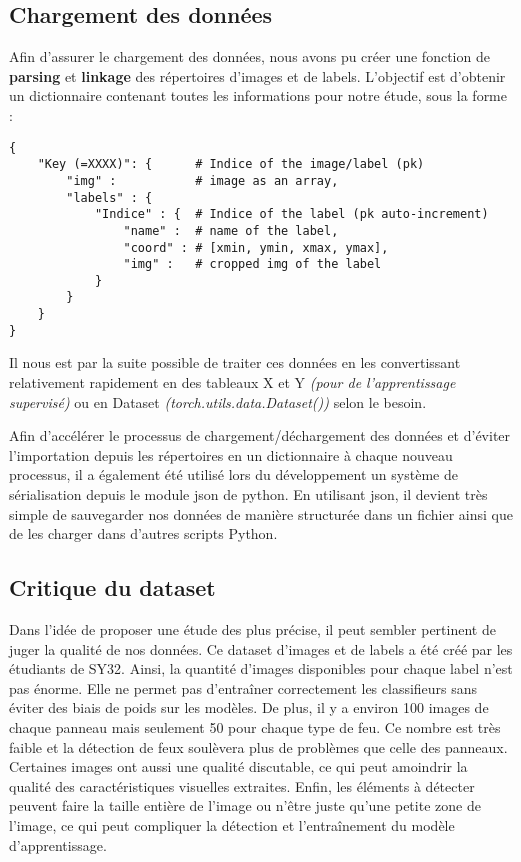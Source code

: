 \documentclass[a4paper,11pt]{article}
\begin{document}
\subsection{Chargement des données}

Afin d'assurer le chargement des données, nous avons pu créer une fonction de \textbf{parsing} et \textbf{linkage} des répertoires d'images et de labels. L'objectif est d'obtenir un dictionnaire contenant toutes les informations pour notre étude, sous la forme : 

\begin{verbatim}
{
    "Key (=XXXX)": {      # Indice of the image/label (pk)
        "img" :           # image as an array,
        "labels" : {
            "Indice" : {  # Indice of the label (pk auto-increment)
                "name" :  # name of the label,
                "coord" : # [xmin, ymin, xmax, ymax],
                "img" :   # cropped img of the label
            }
        }
    }
}
\end{verbatim}

Il nous est par la suite possible de traiter ces données en les convertissant relativement rapidement en des tableaux X et Y \textit{(pour de l'apprentissage supervisé)} ou en Dataset \textit{(torch.utils.data.Dataset())} selon le besoin.

\vspace{2mm}

Afin d'accélérer le processus de chargement/déchargement des données et d'éviter l'importation depuis les répertoires en un dictionnaire à chaque nouveau processus, il a également été utilisé lors du développement un système de sérialisation depuis le module json de python. En utilisant json, il devient très simple de sauvegarder nos données de manière structurée dans un fichier ainsi que de les charger dans d'autres scripts Python.

\subsection{Critique du dataset}

Dans l'idée de proposer une étude des plus précise, il peut sembler pertinent de juger la qualité de nos données.  Ce dataset d'images et de labels a été créé par les étudiants de SY32. Ainsi, la quantité d'images disponibles pour chaque label n'est pas énorme. Elle ne permet pas d'entraîner correctement les classifieurs sans éviter des biais de poids sur les modèles. De plus, il y a environ 100 images de chaque panneau mais seulement 50 pour chaque type de feu. Ce nombre est très faible et la détection de feux soulèvera plus de problèmes que celle des panneaux. Certaines images ont aussi une qualité discutable, ce qui peut amoindrir la qualité des caractéristiques visuelles extraites. Enfin, les éléments à détecter peuvent faire la taille entière de l'image ou n'être juste qu'une petite zone de l'image, ce qui peut compliquer la détection et l'entraînement du modèle d'apprentissage.
\end{document}
